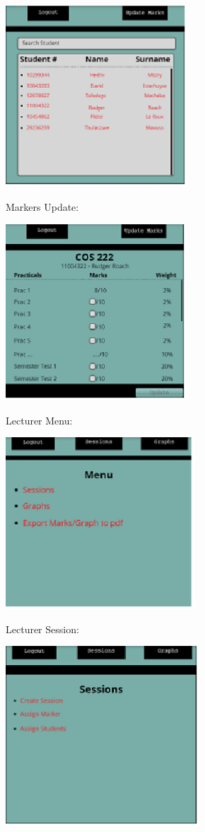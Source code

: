 \documentclass{article}
\begin{document}
\includegraphics*[width=2.68in, height=2.67in, keepaspectratio=false]{image8}



Markers Update:

\includegraphics*[width=2.67in, height=2.60in, keepaspectratio=false]{image9}

Lecturer Menu: 

\includegraphics*[width=2.78in, height=2.53in, keepaspectratio=false]{image10}



Lecturer Session:

\includegraphics*[width=2.86in, height=2.65in, keepaspectratio=false]{image11}
\end{document}
